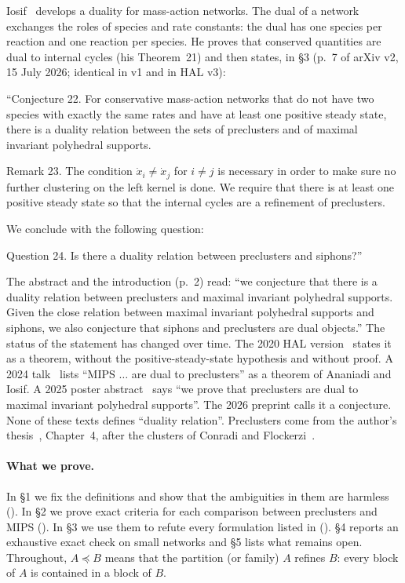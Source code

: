 \documentclass[11pt,a4paper]{report}
\newcommand{\refi}{\preceq}
\begin{document}
Iosif~\autocite{Iosif2026} develops a duality for mass-action networks. The dual of a network exchanges the roles of
species and rate constants: the dual has one species per reaction and one reaction per species. He proves that
conserved quantities are dual to internal cycles (his Theorem~21) and then states, in §3 (p.~7 of arXiv
v2, 15 July 2026; identical in v1 and in HAL v3):

\begin{openquote}
``Conjecture 22. For conservative mass-action networks that do not have two species with exactly the same rates and
have at least one positive steady state, there is a duality relation between the sets of preclusters and of maximal
invariant polyhedral supports.

Remark 23. The condition \(\dot x_i\neq\dot x_j\) for \(i\neq j\) is necessary in order to make sure no further
clustering on the left kernel is done. We require that there is at least one positive steady state so that the
internal cycles are a refinement of preclusters.

We conclude with the following question:

Question 24. Is there a duality relation between preclusters and siphons?''
\end{openquote}

The abstract and the introduction (p.~2) read: ``we conjecture that there is a duality relation between preclusters
and maximal invariant polyhedral supports. Given the close relation between maximal invariant polyhedral supports and
siphons, we also conjecture that siphons and preclusters are dual objects.'' The status of the statement has changed
over time. The 2020 HAL version~\autocite{Iosif2020} states it as a theorem, without the positive-steady-state
hypothesis and without proof. A 2024 talk~\autocite{Iosif2024talk} lists ``MIPS \(\dots\) are dual to preclusters'' as
a theorem of Ananiadi and Iosif. A 2025 poster abstract~\autocite{IosifAnaniadi2025} says ``we prove that preclusters
are dual to maximal invariant polyhedral supports''. The 2026 preprint calls it a conjecture. None of these texts
defines ``duality relation''. Preclusters come from the author's thesis~\autocite{Iosif2019}, Chapter~4, after the
clusters of Conradi and Flockerzi~\autocite{ConradiFlockerzi2012}.

\paragraph{What we prove.} In §1 we fix the definitions and show that the ambiguities in them are harmless
(). In §2 we prove exact criteria for each comparison between preclusters and MIPS
(). In §3 we use them to refute every formulation listed in 
(). §4 reports an exhaustive exact check on small networks and §5 lists what remains open. Throughout,
\(A\refi B\) means that the partition (or family) \(A\) refines \(B\): every block of \(A\) is contained in a block of
\(B\).
\end{document}

